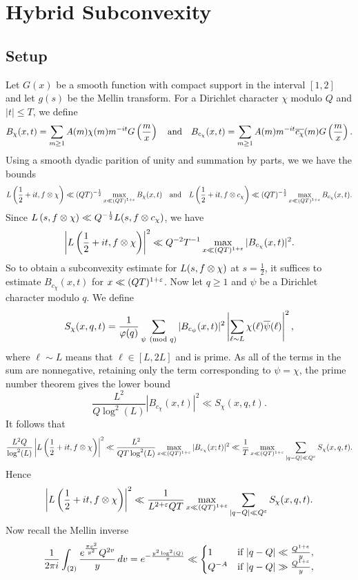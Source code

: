 \documentclass[12pt,reqno,oneside]{amsart}
\begin{document}
\section{Hybrid Subconvexity}
  \subsection*{Setup}
    Let $G(x)$ be a smooth function with compact support in the interval $[1,2]$ and let $g(s)$ be the Mellin transform.
    For a Dirichlet character $\chi$ modulo $Q$ and $|t| \le T$, we define
    \[
      B_{\chi}(x,t) = \sum_{m \ge 1}A(m)\chi(m)m^{-it}G\left(\frac{m}{x}\right) \quad \text{and} \quad B_{c_{\chi}}(x,t) = \sum_{m \ge 1}A(m)m^{-it}\overline{c_{\chi}}(m)G\left(\frac{m}{x}\right).
    \]
    Using a smooth dyadic parition of unity and summation by parts, we we have the bounds
    \[
      L\left(\frac{1}{2}+it,f \otimes \chi \right) \ll (QT)^{-\frac{1}{2}}\max_{x \ll (QT)^{1+\varepsilon}}B_{\chi}(x,t) \quad \text{and} \quad L\left(\frac{1}{2}+it,f \otimes c_{\chi} \right) \ll (QT)^{-\frac{1}{2}}\max_{x \ll (QT)^{1+\varepsilon}}B_{c_{\chi}}(x,t).
    \]
    Since $L\left(s,f \otimes \chi\right) \ll Q^{-\frac{1}{2}}L(s,f \otimes c_{\chi})$, we have
    \[
      \left|L\left(\frac{1}{2}+it,f \otimes \chi \right)\right|^{2} \ll Q^{-2}T^{-1}\max_{x \ll (QT)^{1+\varepsilon}}|B_{c_{\chi}}(x,t)|^{2}.
    \]
    So to obtain a subconvexity estimate for $L(s,f \otimes \chi)$ at $s = \frac{1}{2}$, it suffices to estimate $B_{c_{\chi}}(x,t)$ for $x \ll (QT)^{1+\varepsilon}$. Now let $q \ge 1$ and $\psi$ be a Dirichlet character modulo $q$. We define
    \[
      S_{\chi}(x,q,t) = \frac{1}{\varphi(q)}\sum_{\psi \ \left(\text{mod }q\right)}|B_{c_{\psi}}(x,t)|^{2}\left|\sum_{\ell \sim L}\chi(\ell)\overline{\psi}(\ell)\right|^{2},
    \]
    where $\ell \sim L$ means that $\ell \in [L,2L]$ and is prime. As all of the terms in the sum are nonnegative, retaining only the term corresponding to $\psi = \chi$, the prime number theorem gives the lower bound
    \[
      \frac{L^{2}}{Q\log^{2}(L)}|B_{c_{\chi}}(x,t)|^{2} \ll S_{\chi}(x,q,t).
    \]
    It follows that
    \[
      \frac{L^{2}Q}{\log^{2}(L)}\left|L\left(\frac{1}{2}+it,f \otimes \chi \right)\right|^{2} \ll \frac{L^{2}}{QT\log^{2}(L)}\max_{x \ll (QT)^{1+\varepsilon}}|B_{c_{\chi}}(x;t)|^{2} \ll \frac{1}{T}\max_{x \ll (QT)^{1+\varepsilon}}\sum_{|q-Q| \ll Q^{\varepsilon}}S_{\chi}(x,q,t).
    \]
    Hence
    \[
      \left|L\left(\frac{1}{2}+it,f \otimes \chi \right)\right|^{2} \ll \frac{1}{L^{2+\varepsilon}QT}\max_{x \ll (QT)^{1+\varepsilon}}\sum_{|q-Q| \ll Q^{\varepsilon}}S_{\chi}(x,q,t).
    \]
    Now recall the Mellin inverse
    \[
      \frac{1}{2\pi i}\int_{(2)}\frac{e^{\frac{\pi v^{2}}{y^{2}}}Q^{2v}}{y}\,dv = e^{-\frac{y^{2}\log^{2}(Q)}{\pi}} \ll \begin{cases} 1 & \text{if $|q-Q| \ll \frac{Q^{1+e}}{y}$}, \\ Q^{-A} & \text{if $|q-Q| \gg \frac{Q^{1+\varepsilon}}{y}$}, \end{cases}
    \]
\end{document}
